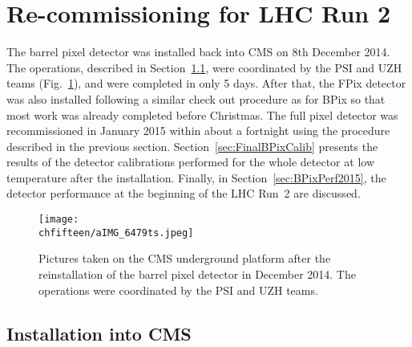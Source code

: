 \section{Re-commissioning for LHC Run 2}\label{sec:commissioning}

The barrel pixel detector was installed back into CMS on 8th December 2014.
The operations, described in Section~\ref{sec:BPixInst}, were coordinated by the PSI and UZH teams (Fig.~\ref{fig:BPixInst}), and were completed in only 5 days.
After that, the FPix detector was also installed following a similar check out procedure as for BPix so that most work was already completed before Christmas.
The full pixel detector was recommissioned in January 2015 within about a fortnight using the procedure described in the previous section.
Section~\ref{sec:FinalBPixCalib} presents the results of the detector calibrations performed for the whole detector at low temperature after the installation.
Finally, in Section~\ref{sec:BPixPerf2015}, the detector performance at the beginning of the LHC Run~2 are discussed.

\begin{figure}[!htb]
 \begin{center}
 \texttt{[image: \\chfifteen/aIMG\_6479ts.jpeg]}
 \end{center}
 \caption{Pictures taken on the CMS underground platform after the reinstallation of the barrel pixel detector in December 2014. The operations were coordinated by the PSI and UZH teams.}
 \label{fig:BPixInst}
\end{figure}

\subsection{Installation into CMS}\label{sec:BPixInst}

